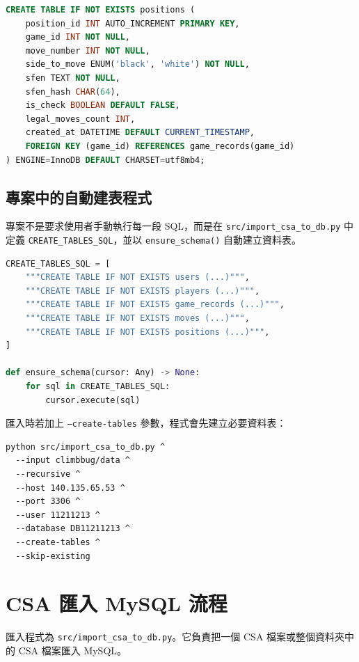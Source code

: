\documentclass[12pt,a4paper,fontset=none]{ctexart}
\begin{document}
\begin{lstlisting}[style=sqlstyle,language=SQL]
CREATE TABLE IF NOT EXISTS positions (
    position_id INT AUTO_INCREMENT PRIMARY KEY,
    game_id INT NOT NULL,
    move_number INT NOT NULL,
    side_to_move ENUM('black', 'white') NOT NULL,
    sfen TEXT NOT NULL,
    sfen_hash CHAR(64),
    is_check BOOLEAN DEFAULT FALSE,
    legal_moves_count INT,
    created_at DATETIME DEFAULT CURRENT_TIMESTAMP,
    FOREIGN KEY (game_id) REFERENCES game_records(game_id)
) ENGINE=InnoDB DEFAULT CHARSET=utf8mb4;
\end{lstlisting}

\subsection{專案中的自動建表程式}

專案不是要求使用者手動執行每一段 SQL，而是在 \texttt{src/import\_csa\_to\_db.py} 中定義 \texttt{CREATE\_TABLES\_SQL}，並以 \texttt{ensure\_schema()} 自動建立資料表。

\begin{lstlisting}[style=pystyle,language=Python]
CREATE_TABLES_SQL = [
    """CREATE TABLE IF NOT EXISTS users (...)""",
    """CREATE TABLE IF NOT EXISTS players (...)""",
    """CREATE TABLE IF NOT EXISTS game_records (...)""",
    """CREATE TABLE IF NOT EXISTS moves (...)""",
    """CREATE TABLE IF NOT EXISTS positions (...)""",
]

def ensure_schema(cursor: Any) -> None:
    for sql in CREATE_TABLES_SQL:
        cursor.execute(sql)
\end{lstlisting}

匯入時若加上 \texttt{--create-tables} 參數，程式會先建立必要資料表：

\begin{lstlisting}[style=sqlstyle]
python src/import_csa_to_db.py ^
  --input climbbug/data ^
  --recursive ^
  --host 140.135.65.53 ^
  --port 3306 ^
  --user 11211213 ^
  --database DB11211213 ^
  --create-tables ^
  --skip-existing
\end{lstlisting}

\section{CSA 匯入 MySQL 流程}

匯入程式為 \texttt{src/import\_csa\_to\_db.py}。它負責把一個 CSA 檔案或整個資料夾中的 CSA 檔案匯入 MySQL。
\end{document}
